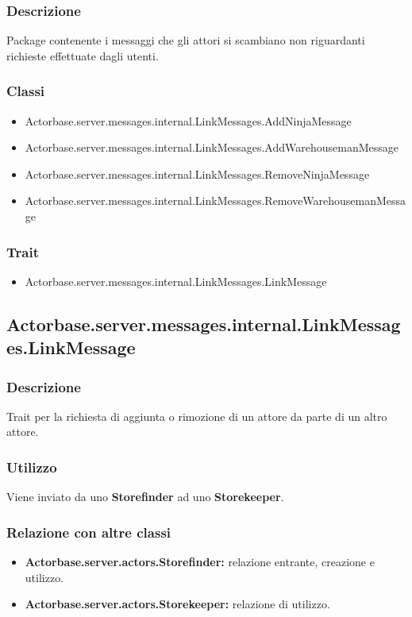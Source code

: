 \documentclass[a4paper]{article}
\begin{document}
			\subsubsection{Descrizione}
				Package contenente i messaggi che gli attori si scambiano non riguardanti richieste effettuate dagli utenti.
				
			\subsubsection{Classi}
				\begin{itemize}
					\item Actorbase.server.messages.internal.LinkMessages.AddNinjaMessage
					\item Actorbase.server.messages.internal.LinkMessages.AddWarehousemanMessage
					\item Actorbase.server.messages.internal.LinkMessages.RemoveNinjaMessage
					\item Actorbase.server.messages.internal.LinkMessages.RemoveWarehousemanMessage
				\end{itemize}
			
			\subsubsection{Trait}
				\begin{itemize}
					\item Actorbase.server.messages.internal.LinkMessages.LinkMessage
				\end{itemize}
				
		\subsection{Actorbase.server.messages.internal.LinkMessages.LinkMessage}
			\subsubsection{Descrizione}
				Trait per la richiesta di aggiunta o rimozione di un attore da parte di un altro attore.
				
			\subsubsection{Utilizzo}
				Viene inviato da uno \textbf{Storefinder} ad uno \textbf{Storekeeper}.
				
			\subsubsection{Relazione con altre classi}
				\begin{itemize}
					\item \textbf{Actorbase.server.actors.Storefinder:} relazione entrante, creazione e utilizzo.
					\item \textbf{Actorbase.server.actors.Storekeeper:} relazione di utilizzo.
				\end{itemize}
				
\end{document}
